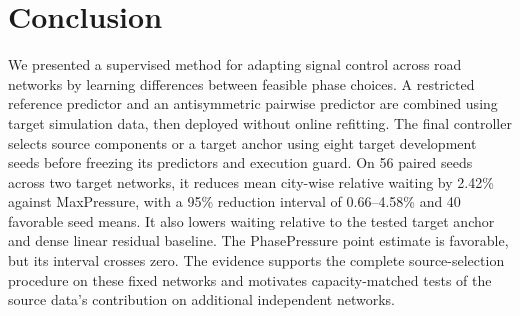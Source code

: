\section{Conclusion}
We presented a supervised method for adapting signal control across road networks by learning differences between feasible phase choices. A restricted reference predictor and an antisymmetric pairwise predictor are combined using target simulation data, then deployed without online refitting. The final controller selects source components or a target anchor using eight target development seeds before freezing its predictors and execution guard. On 56 paired seeds across two target networks, it reduces mean city-wise relative waiting by 2.42\% against MaxPressure, with a 95\% reduction interval of 0.66--4.58\% and 40 favorable seed means. It also lowers waiting relative to the tested target anchor and dense linear residual baseline. The PhasePressure point estimate is favorable, but its interval crosses zero. The evidence supports the complete source-selection procedure on these fixed networks and motivates capacity-matched tests of the source data's contribution on additional independent networks.
